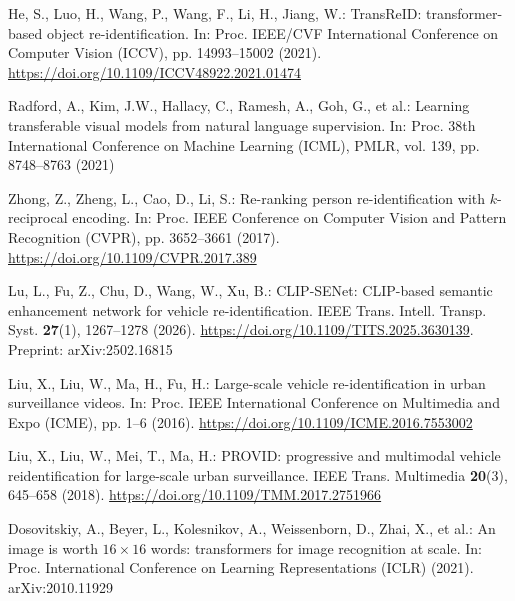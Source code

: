 He, S., Luo, H., Wang, P., Wang, F., Li, H., Jiang, W.: TransReID:
transformer-based object re-identification. In: Proc. IEEE/CVF International
Conference on Computer Vision (ICCV), pp. 14993--15002 (2021).
\url{https://doi.org/10.1109/ICCV48922.2021.01474}

Radford, A., Kim, J.W., Hallacy, C., Ramesh, A., Goh, G., et al.: Learning
transferable visual models from natural language supervision. In: Proc. 38th
International Conference on Machine Learning (ICML), PMLR, vol. 139,
pp. 8748--8763 (2021)

Zhong, Z., Zheng, L., Cao, D., Li, S.: Re-ranking person re-identification with
$k$-reciprocal encoding. In: Proc. IEEE Conference on Computer Vision and
Pattern Recognition (CVPR), pp. 3652--3661 (2017).
\url{https://doi.org/10.1109/CVPR.2017.389}

Lu, L., Fu, Z., Chu, D., Wang, W., Xu, B.: CLIP-SENet: CLIP-based semantic
enhancement network for vehicle re-identification. IEEE Trans. Intell. Transp.
Syst. \textbf{27}(1), 1267--1278 (2026).
\url{https://doi.org/10.1109/TITS.2025.3630139}. Preprint: arXiv:2502.16815

Liu, X., Liu, W., Ma, H., Fu, H.: Large-scale vehicle re-identification in
urban surveillance videos. In: Proc. IEEE International Conference on
Multimedia and Expo (ICME), pp. 1--6 (2016).
\url{https://doi.org/10.1109/ICME.2016.7553002}

Liu, X., Liu, W., Mei, T., Ma, H.: PROVID: progressive and multimodal vehicle
reidentification for large-scale urban surveillance. IEEE Trans. Multimedia
\textbf{20}(3), 645--658 (2018). \url{https://doi.org/10.1109/TMM.2017.2751966}

Dosovitskiy, A., Beyer, L., Kolesnikov, A., Weissenborn, D., Zhai, X., et al.:
An image is worth $16\times16$ words: transformers for image recognition at
scale. In: Proc. International Conference on Learning Representations (ICLR)
(2021). arXiv:2010.11929

